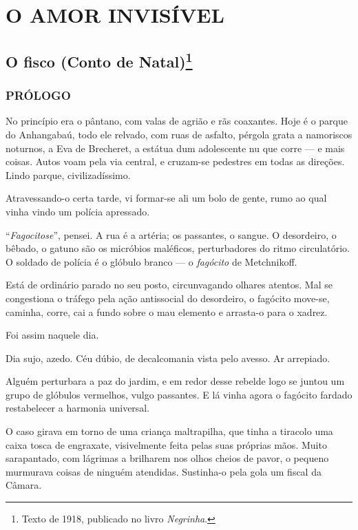 \part{O AMOR INVISÍVEL}

\chapter{O fisco (Conto de Natal)\footnote[*]{Texto de 1918, publicado no livro \emph{Negrinha}.}}

\section{PRÓLOGO}

No princípio era o pântano, com valas de agrião e rãs coaxantes. Hoje é
o parque do Anhangabaú, todo ele relvado, com ruas de asfalto, pérgola
grata a namoriscos noturnos, a Eva de Brecheret, a estátua dum
adolescente nu que corre --- e mais coisas. Autos voam pela via central,
e cruzam-se pedestres em todas as direções. Lindo parque,
civilizadíssimo.

Atravessando-o certa tarde, vi formar-se ali um bolo de gente, rumo ao
qual vinha vindo um polícia apressado.

``\emph{Fagocitose}'', pensei. A rua é a artéria; os passantes, o
sangue. O desordeiro, o bêbado, o gatuno são os micróbios maléficos,
perturbadores do ritmo circulatório. O soldado de polícia é o glóbulo
branco --- o \emph{fagócito} de Metchnikoff.

Está de ordinário parado no seu posto, circunvagando olhares atentos.
Mal se congestiona o tráfego pela ação antissocial do desordeiro, o
fagócito move-se, caminha, corre, cai a fundo sobre o mau elemento e
arrasta-o para o xadrez.

Foi assim naquele dia.

Dia sujo, azedo. Céu dúbio, de decalcomania vista pelo avesso. Ar
arrepiado.

Alguém perturbara a paz do jardim, e em redor desse rebelde logo se
juntou um grupo de glóbulos vermelhos, vulgo passantes. E lá vinha agora
o fagócito fardado restabelecer a harmonia universal.

O caso girava em torno de uma criança maltrapilha, que tinha a tiracolo
uma caixa tosca de engraxate, visivelmente feita pelas suas próprias
mãos. Muito sarapantado, com lágrimas a brilharem nos olhos cheios de
pavor, o pequeno murmurava coisas de ninguém atendidas. Sustinha-o pela
gola um fiscal da Câmara.

